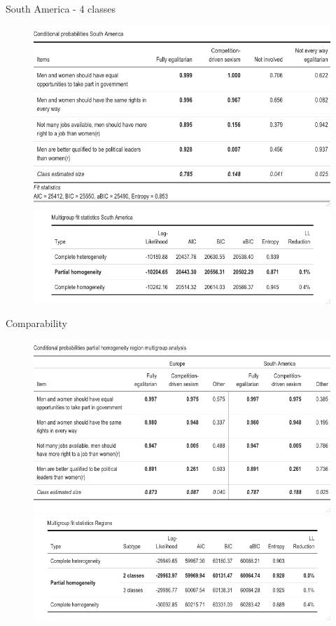 \documentclass[11pt,t]{beamer}
\begin{document}
\begin{frame}{South America - 4 classes}
	
\begin{figure}
	\centering
	\includegraphics[height=0.4\textwidth]{graphics/prob_la.png}\\
	\includegraphics[height=0.2\textwidth]{graphics/mg_la.png}
\end{figure}
	
\end{frame} 


\begin{frame}{Comparability}
	
\begin{figure}
	\centering
	\includegraphics[height=0.4\textwidth]{graphics/prob_reg.png}\\
	\includegraphics[height=0.2\textwidth]{graphics/mg_reg.png}
\end{figure}
	
\end{frame} 
\end{document}
